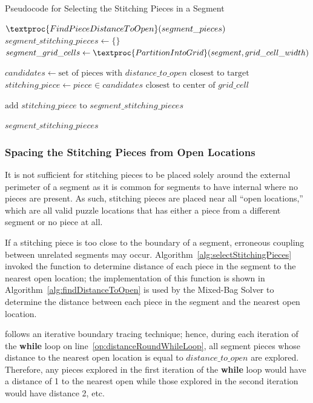 \begin{algorithm}[tb]
\caption{Pseudocode for Selecting the Stitching Pieces in a Segment}
\label{alg:selectStitchingPieces}
\begin{algorithmic}[1]
	\State $\textproc{FindPieceDistanceToOpen}(segment\_pieces)$
	\State $segment\_stitching\_pieces \gets \{ \}$
    \State $segment\_grid\_cells \gets \textproc{PartitionIntoGrid}(segment, grid\_cell\_width)$
\item []
			\State $candidates \gets \text{set of pieces with } distance\_to\_open \text{ closest to target}$
			\State $stitching\_piece \gets piece \in candidates \text{ closest to center of } grid\_cell$
\item []
			\State $\text{add } stitching\_piece \text{ to } segment\_stitching\_pieces$
		\EndIf
	\EndFor
\item []
	\State \Return $segment\_stitching\_pieces$
\EndProcedure
\end{algorithmic}
\end{algorithm}


\subsubsection{Spacing the Stitching Pieces from Open Locations}\label{sec:determiningSpacingToNearestOpenLocation}

It is not sufficient for stitching pieces to be placed solely around the external perimeter of a segment as it is common for segments to have internal where no pieces are present.  As such, stitching pieces are placed near all ``open locations,'' which are all valid puzzle locations that has either a piece from a different segment or no piece at all. 

If a stitching piece is too close to the boundary of a segment, erroneous coupling between unrelated segments may occur.  Algorithm~\ref{alg:selectStitchingPieces} invoked the function  to determine distance of each piece in the segment to the nearest open location; the implementation of this function is shown in Algorithm~\ref{alg:findDistanceToOpen} is used by the Mixed-Bag Solver to determine the distance between each piece in the segment and the nearest open location.  

 follows an iterative boundary tracing technique; hence, during each iteration of the \textbf{while} loop on line~\ref{op:distanceRoundWhileLoop}, all segment pieces whose distance to the nearest open location is equal to $distance\_to\_open$ are explored.  Therefore, any pieces explored in the first iteration of the \textbf{while} loop would have a distance of 1 to the nearest open while those explored in the second iteration would have distance 2, etc. 

